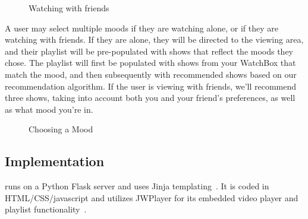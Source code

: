 \begin{figure}
\centering
{}


\caption{Watching with friends}
\label{fig:friends}
\end{figure}

A user may select multiple moods if they are watching alone, or if
they are watching with friends.  If they are alone, they will be
directed to the viewing area, and their playlist will be pre-populated
with shows that reflect the moods they chose.  The playlist will first
be populated with shows from your WatchBox that match the mood, and
then subsequently with recommended shows based on our recommendation
algorithm.  If the user is viewing with friends, we’ll recommend three
shows, taking into account both you and your friend’s preferences, as
well as what mood you’re in.

\begin{figure}
\centering
{}
\caption{Choosing a Mood}
\label{fig:mood}
\end{figure}

\subsection{Implementation}
{\sys} runs on a Python Flask server and uses Jinja
templating~\cite{flask,jinja}.  It is coded in HTML/CSS/javascript and utilizes JWPlayer
for its embedded video player and playlist functionality~\cite{jwplayer}.
